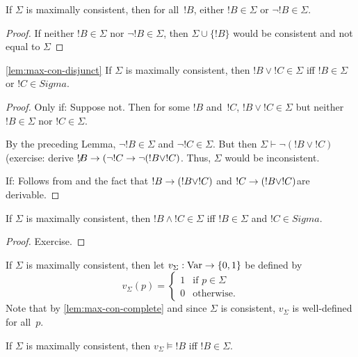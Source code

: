 \documentclass[propositional-logic]{subfiles}
\begin{document}
\begin{lem}\label{lem:max-con-complete}
If $\Sigma$ is maximally consistent, then for all~$!B$, either $!B \in
\Sigma$ or $\lnot !B \in \Sigma$.
\end{lem}

\begin{proof}
If neither $!B \in \Sigma$ nor $\lnot !B \in \Sigma$, then $\Sigma
\cup \{!B\}$ would be consistent and not equal to $\Sigma$
\end{proof}

\begin{lem}\ref{lem:max-con-disjunct}
If $\Sigma$ is maximally consistent, then $!B \lor !C \in \Sigma$ iff
$!B \in \Sigma$ or $!C \in Sigma$.
\end{lem}

\begin{proof}
Only if: Suppose not.  Then for some $!B$ and~$!C$, $!B \lor !C\in
\Sigma$ but neither $!B \in \Sigma$ nor $!C \in \Sigma$.

By the preceding Lemma, $\lnot !B \in \Sigma$ and $\lnot !C \in
\Sigma$.  But then $\Sigma \vdash \lnot(!B \lor !C)$ (exercise: derive
$\not !B \to (\lnot !C \to \lnot(!B \lor !C)$.  Thus, $\Sigma$ would
be inconsistent.

If: Follows from \label{lem:max-con-complete} and the fact that $!B
\to (!B \lor !C)$ and $!C \to (!B \lor !C)$are derivable.
\end{proof}

\begin{lem}
If $\Sigma$ is maximally consistent, then $!B \land !C \in \Sigma$ iff
$!B \in \Sigma$ and $!C \in Sigma$.
\end{lem}

\begin{proof}
Exercise.
\end{proof}

\begin{defn}
If $\Sigma$ is maximally consistent, then let $v_\Sigma: \mathrm{Var} \to \{0,
1\}$ be defined by
\[
v_\Sigma(p) =
\begin{cases}
1 & \text{if $p \in \Sigma$} \\ 
0 & \text{otherwise.}
\end{cases}
\]
Note that by \ref{lem:max-con-complete} and since $\Sigma$ is
consistent, $v_\Sigma$ is well-defined for all~$p$.
\end{defn}

\begin{lem}\label{lem:truth}
If $\Sigma$ is maximally consistent, then $v_\Sigma \models !B$ iff
$!B \in \Sigma$.
\end{lem}
\end{document}

